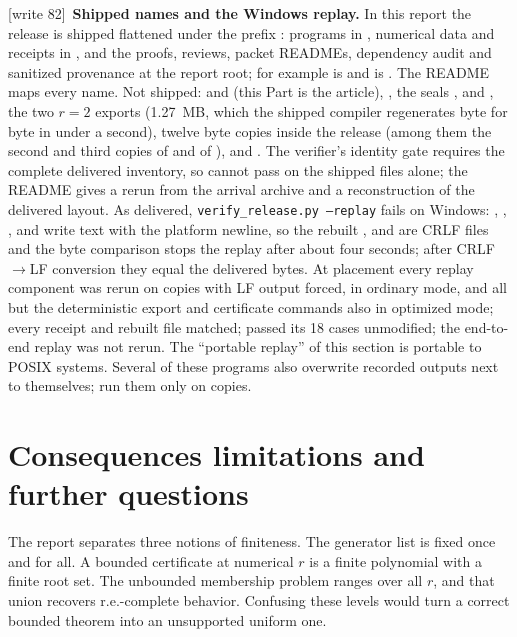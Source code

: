 \documentclass[11pt,letterpaper]{article}
\theoremstyle{definition}
\theoremstyle{remark}
\newcommand{\wtagc}{\textup{[write 82]}}
\begin{document}
\wtagc\ \textbf{Shipped names and the Windows replay.} In this report the release is shipped flattened under the prefix : programs in , numerical data and receipts in , and the proofs, reviews, packet READMEs, dependency audit and sanitized provenance at the report root; for example  is  and  is . The README maps every name. Not shipped:  and  (this Part is the article), , the seals ,  and , the two $r=2$ exports (1.27~MB, which the shipped compiler regenerates byte for byte in under a second), twelve byte copies inside the release (among them the second and third copies of  and of ), and . The verifier's identity gate requires the complete delivered inventory, so  cannot pass on the shipped files alone; the README gives a rerun from the arrival archive and a reconstruction of the delivered layout. As delivered, \texttt{verify\_release.py --replay} fails on Windows: , , ,  and  write text with the platform newline, so the rebuilt ,  and  are CRLF files and the byte comparison stops the replay after about four seconds; after CRLF$\to$LF conversion they equal the delivered bytes. At placement every replay component was rerun on copies with LF output forced, in ordinary mode, and all but the deterministic export and certificate commands also in optimized mode; every receipt and rebuilt file matched;  passed its 18 cases unmodified; the end-to-end replay was not rerun. The ``portable replay'' of this section is portable to POSIX systems. Several of these programs also overwrite recorded outputs next to themselves; run them only on copies.

\section{Consequences limitations and further questions}
\label{gts:um:sec:future}
The report separates three notions of finiteness. The generator list is fixed once and for all. A bounded certificate at numerical $r$ is a finite polynomial with a finite root set. The unbounded membership problem ranges over all $r$, and that union recovers r.e.-complete behavior. Confusing these levels would turn a correct bounded theorem into an unsupported uniform one.
\end{document}
